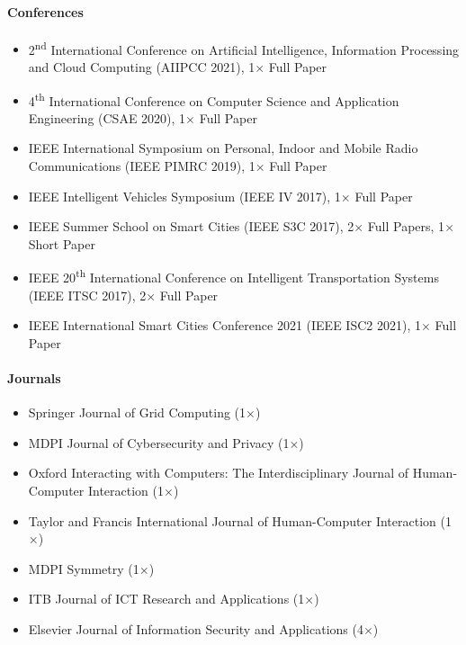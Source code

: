 \documentclass[10pt,a4paper]{article}
\begin{document}
\paragraph{Conferences}
\begin{itemize}[leftmargin=*]
    \item 2\textsuperscript{nd} International Conference on Artificial Intelligence, Information Processing and Cloud Computing (AIIPCC 2021), 1$\times$ Full Paper
    \item 4\textsuperscript{th} International Conference on Computer Science and Application Engineering (CSAE 2020), 1$\times$ Full Paper
    \item IEEE International Symposium on Personal, Indoor and Mobile Radio Communications (IEEE PIMRC 2019), 1$\times$ Full Paper
    \item IEEE Intelligent Vehicles Symposium (IEEE IV 2017), 1$\times$ Full Paper
    \item IEEE Summer School on Smart Cities (IEEE S3C 2017), 2$\times$ Full Papers, 1$\times$ Short Paper
    \item IEEE 20\textsuperscript{th} International Conference on Intelligent Transportation Systems (IEEE ITSC 2017), 2$\times$ Full Paper
    \item IEEE International Smart Cities Conference 2021 (IEEE ISC2 2021), 1$\times$ Full Paper
\end{itemize}

\paragraph{Journals}
\begin{itemize}[leftmargin=*]
\item Springer Journal of Grid Computing (1$\times$)
\item MDPI Journal of Cybersecurity and Privacy (1$\times$)
\item Oxford Interacting with Computers: The Interdisciplinary Journal of Human-Computer Interaction (1$\times$)
\item Taylor and Francis International Journal of Human-Computer Interaction (1$\times$)
\item MDPI Symmetry (1$\times$)
\item ITB Journal of ICT Research and Applications (1$\times$)
\item Elsevier Journal of Information Security and Applications (4$\times$)
\end{itemize}
\end{document}
